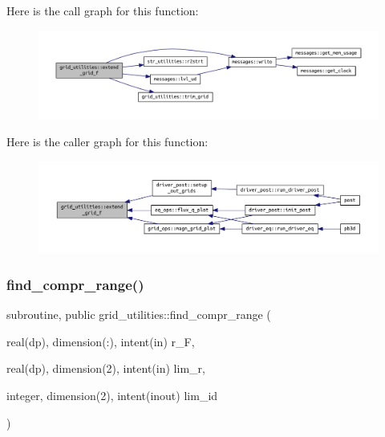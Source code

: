 Here is the call graph for this function\+:\nopagebreak
\begin{figure}[H]
\begin{center}
\leavevmode
\includegraphics[width=350pt]{namespacegrid__utilities_a414a1a11924bc935afca3a89fc31f2f5_cgraph}
\end{center}
\end{figure}
Here is the caller graph for this function\+:\nopagebreak
\begin{figure}[H]
\begin{center}
\leavevmode
\includegraphics[width=350pt]{namespacegrid__utilities_a414a1a11924bc935afca3a89fc31f2f5_icgraph}
\end{center}
\end{figure}
\mbox{\label{namespacegrid__utilities_ae08e1ff213071c9d411a9b9c76035e1e}} 
\subsubsection{\texorpdfstring{find\+\_\+compr\+\_\+range()}{find\_compr\_range()}}
{\footnotesize\ttfamily subroutine, public grid\+\_\+utilities\+::find\+\_\+compr\+\_\+range (\begin{DoxyParamCaption}\item[{real(dp), dimension(\+:), intent(in)}]{r\+\_\+F,  }\item[{real(dp), dimension(2), intent(in)}]{lim\+\_\+r,  }\item[{integer, dimension(2), intent(inout)}]{lim\+\_\+id }\end{DoxyParamCaption})}



